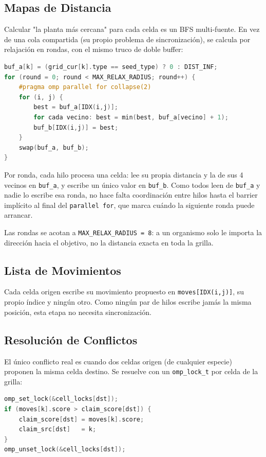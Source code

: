 \documentclass[11pt]{article}
\begin{document}
\subsection{Mapas de Distancia}
\label{sec:distmaps}

Calcular "la planta más cercana" para cada celda es un BFS multi-fuente.
En vez de una cola compartida (su propio problema de sincronización), se
calcula por relajación en rondas, con el mismo truco de doble buffer:

\begin{lstlisting}[language=c]
buf_a[k] = (grid_cur[k].type == seed_type) ? 0 : DIST_INF;
for (round = 0; round < MAX_RELAX_RADIUS; round++) {
    #pragma omp parallel for collapse(2)
    for (i, j) {
        best = buf_a[IDX(i,j)];
        for cada vecino: best = min(best, buf_a[vecino] + 1);
        buf_b[IDX(i,j)] = best;
    }
    swap(buf_a, buf_b);
}
\end{lstlisting}

Por ronda, cada hilo procesa una celda: lee su propia distancia y la de
sus 4 vecinos en \texttt{buf\_a}, y escribe un único valor en
\texttt{buf\_b}. Como todos leen de \texttt{buf\_a} y nadie lo escribe
esa ronda, no hace falta coordinación entre hilos hasta el barrier
implícito al final del \texttt{parallel for}, que marca cuándo la
siguiente ronda puede arrancar.

Las rondas se acotan a \texttt{MAX\_RELAX\_RADIUS = 8}: a un organismo
solo le importa la dirección hacia el objetivo, no la distancia exacta en
toda la grilla.

\subsection{Lista de Movimientos}

Cada celda origen escribe su movimiento propuesto en
\texttt{moves[IDX(i,j)]}, su propio índice y ningún otro. Como ningún par
de hilos escribe jamás la misma posición, esta etapa no necesita
sincronización.

\subsection{Resolución de Conflictos}
\label{sec:resolve}

El único conflicto real es cuando dos celdas origen (de cualquier
especie) proponen la misma celda destino. Se resuelve con un
\texttt{omp\_lock\_t} por celda de la grilla:

\begin{lstlisting}[language=c]
omp_set_lock(&cell_locks[dst]);
if (moves[k].score > claim_score[dst]) {
    claim_score[dst] = moves[k].score;
    claim_src[dst]   = k;
}
omp_unset_lock(&cell_locks[dst]);
\end{lstlisting}
\end{document}
